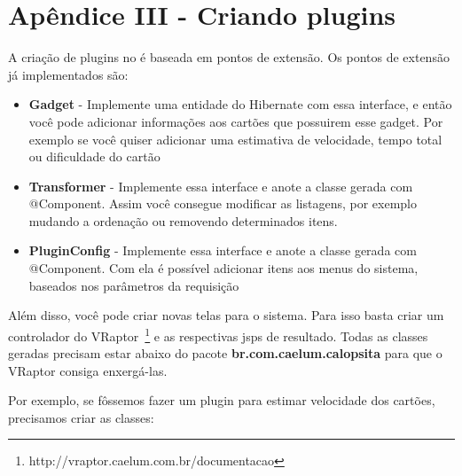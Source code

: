 \section{Apêndice III - Criando plugins}

A criação de plugins no \calopsita{} é baseada em pontos de extensão. Os pontos de extensão já implementados são:

\begin{itemize}
	\item{\textbf{Gadget} - Implemente uma entidade do Hibernate com essa interface, e então você pode adicionar informações aos cartões que possuirem esse gadget. Por exemplo se você quiser adicionar uma estimativa de velocidade, tempo total ou dificuldade do cartão}
	\item{\textbf{Transformer} - Implemente essa interface e anote a classe gerada com @Component. Assim você consegue modificar as listagens, por exemplo mudando a ordenação ou removendo determinados itens.}
	\item{\textbf{PluginConfig} - Implemente essa interface e anote a classe gerada com @Component. Com ela é possível adicionar itens aos menus do sistema, baseados nos parâmetros da requisição}
\end{itemize}

Além disso, você pode criar novas telas para o sistema. Para isso basta criar um controlador do 
VRaptor~\footnote{http://vraptor.caelum.com.br/documentacao} e as respectivas jsps de resultado.
Todas as classes geradas precisam estar abaixo do pacote \textbf{br.com.caelum.calopsita} para que o VRaptor consiga enxergá-las.

Por exemplo, se fôssemos fazer um plugin para estimar velocidade dos cartões, precisamos criar as classes:

